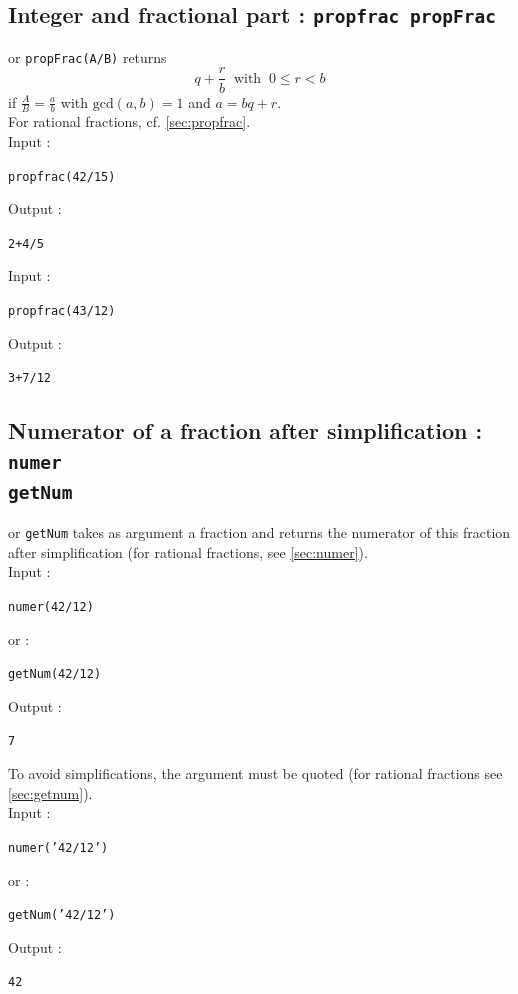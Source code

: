 \documentclass[a4paper,11pt]{book}
\begin{document}
\subsection{Integer and fractional part : {\tt propfrac propFrac}}\label{sec:ipropfrac}
 or {\tt propFrac(A/B)} returns 
$$q+\frac{r}{b}\ \mbox{ with } \ 0\leq r<b$$ 
if  $\displaystyle \frac{A}{B}=\frac{a}{b}$ with $\mbox{gcd}(a,b)=1$
and $a=bq+r$.\\
For rational fractions, cf. \ref{sec:propfrac}.\\
Input :
\begin{center}{\tt propfrac(42/15)}\end{center}
Output :
\begin{center}{\tt 2+4/5}\end{center}
Input :
\begin{center}{\tt  propfrac(43/12)}\end{center}
Output :
\begin{center}{\tt  3+7/12}\end{center}

\subsection{Numerator of a fraction after simplification : {\tt numer}\\
{\tt getNum}}\label{sec:inumer}
 or {\tt getNum} takes as argument a fraction and returns 
the numerator of this fraction  after simplification (for rational fractions,
see \ref{sec:numer}).\\
Input :
\begin{center}{\tt  numer(42/12)}\end{center}
or :
\begin{center}{\tt getNum(42/12)}\end{center}
Output :
\begin{center}{\tt 7}\end{center}
To avoid simplifications, the argument must
be quoted (for rational fractions see \ref{sec:getnum}).\\
Input :
\begin{center}{\tt  numer('42/12')}\end{center}
or :
\begin{center}{\tt  getNum('42/12')}\end{center}
Output :
\begin{center}{\tt 42}\end{center}
\end{document}
